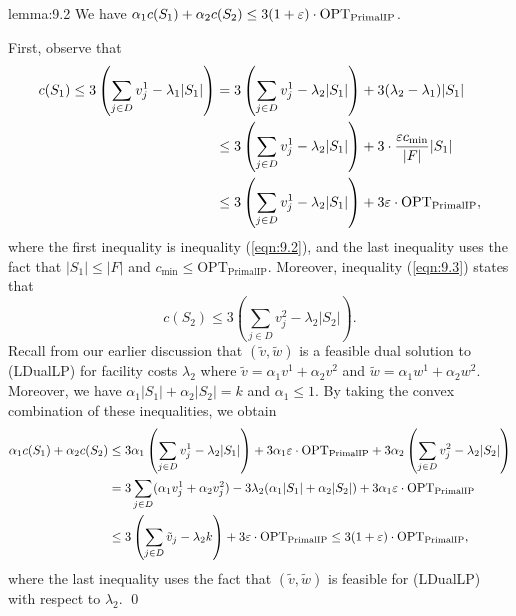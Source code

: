 \begin{lemma}{lemma:9.2}
    We have $\alpha_1 c(S_1) + \alpha_2 c(S_2) \leq 3(1+\varepsilon) \cdot 
    \text{OPT}_{\text{PrimalIP}}$. 
\end{lemma}\vspace{-0.25cm} 
\begin{pf}
    First, observe that 
    \begin{align*}
        c(S_1) \leq 3 \left( \sum_{j\in D} v_j^1 - \lambda_1 |S_1| \right) 
        &= 3 \left( \sum_{j\in D} v_j^1 - \lambda_2 |S_1| \right) 
        + 3(\lambda_2 - \lambda_1) |S_1| \\ 
        &\leq 3 \left( \sum_{j\in D} v_j^1 - \lambda_2 |S_1| \right) 
        + 3 \cdot \frac{\varepsilon c_{\min}}{|F|} |S_1| \\ 
        &\leq 3 \left( \sum_{j\in D} v_j^1 - \lambda_2 |S_1| \right) 
        + 3\varepsilon \cdot \text{OPT}_{\text{PrimalIP}},
    \end{align*}
    where the first inequality is inequality (\ref{eqn:9.2}), and the 
    last inequality uses the fact that $|S_1| \leq |F|$ and 
    $c_{\min} \leq \text{OPT}_{\text{PrimalIP}}$. Moreover, 
    inequality (\ref{eqn:9.3}) states that 
    \[ c(S_2) \leq 3\left( \sum_{j\in D} v_j^2 - \lambda_2 |S_2| \right). \] 
    Recall from our earlier discussion that $(\tilde v, \tilde w)$ is a feasible dual solution 
    to (LDualLP) for facility costs $\lambda_2$ where $\tilde v = 
    \alpha_1 v^1 + \alpha_2 v^2$ and $\tilde w = \alpha_1 w^1 + \alpha_2 w^2$. 
    Moreover, we have $\alpha_1 |S_1| + \alpha_2 |S_2| = k$ and 
    $\alpha_1 \leq 1$. 
    By taking the convex combination of these inequalities, we obtain 
    \begin{align*} 
        \alpha_1 c(S_1) + \alpha_2 c(S_2) 
        &\leq 3\alpha_1 \left( \sum_{j\in D} v_j^1 - \lambda_2 |S_1| \right) 
        + 3\alpha_1\varepsilon \cdot \text{OPT}_{\text{PrimalIP}} + 
        3\alpha_2 \left( \sum_{j\in D} v_j^2 - \lambda_2 |S_2| \right) \\ 
        &= 3 \sum_{j\in D} (\alpha_1 v_j^1 + \alpha_2 v_j^2) - 3\lambda_2 
        (\alpha_1 |S_1| + \alpha_2 |S_2|) + 3\alpha_1\varepsilon \cdot 
        \text{OPT}_{\text{PrimalIP}} \\ 
        &\leq 3 \left( \sum_{j\in D} \tilde v_j - \lambda_2 k \right) 
        + 3\varepsilon \cdot \text{OPT}_{\text{PrimalIP}}  
        \leq 3(1 + \varepsilon) \cdot \text{OPT}_{\text{PrimalIP}},
    \end{align*}
    where the last inequality uses the fact that $(\tilde v, \tilde w)$ 
    is feasible for (LDualLP) with respect to $\lambda_2$. \qed 
\end{pf}\vspace{-0.25cm} 


